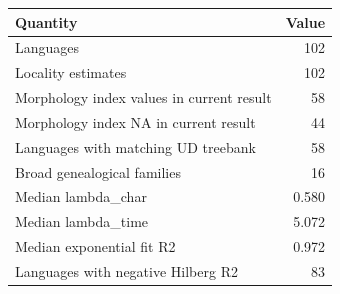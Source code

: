 \begin{tabular}{lr}\toprule Quantity & Value\\ \midrule
Languages & 102\\
Locality estimates & 102\\
Morphology index values in current result & 58\\
Morphology index NA in current result & 44\\
Languages with matching UD treebank & 58\\
Broad genealogical families & 16\\
Median lambda\_char & 0.580\\
Median lambda\_time & 5.072\\
Median exponential fit R2 & 0.972\\
Languages with negative Hilberg R2 & 83\\
\bottomrule\end{tabular}
